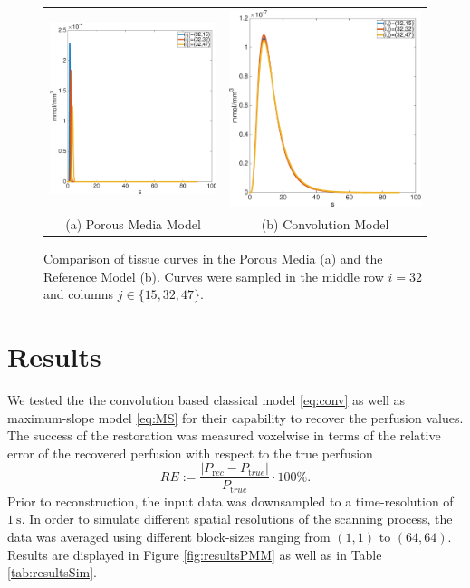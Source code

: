 \documentclass[paper=a4, fontsize=11pt,parskip=half,headings=small]{scrartcl}
\begin{document}
	\begin{figure}[H]
		\centering
		\begin{tabular}{c c}
			\includegraphics[width=.45\textwidth]{figs/PM153247.eps} & \includegraphics[width=.45\textwidth]{figs/RM153247.eps} \\
			(a) Porous Media Model & (b) Convolution Model
		\end{tabular}
		\caption{Comparison of tissue curves in the Porous Media (a) and the Reference Model (b). Curves were sampled in the middle row $i=32$ and columns $j \in \{15,32,47\}$.}
		\label{fig:tissuecomp}
	\end{figure}
	
	

	\section{Results}\label{sec:results}

	We tested the the convolution based classical model \eqref{eq:conv} as well as maximum-slope model \eqref{eq:MS} for their capability to recover the perfusion values.
	The success of the restoration was measured voxelwise in terms of the relative error of the recovered perfusion with respect to the true perfusion
	\[
		RE := \frac{\vert P_{\mathrm rec} - P_{\mathrm true}\vert}{P_{\mathrm true}}\cdot 100\%.
	\]
	Prior to reconstruction, the input data was downsampled to a time-resolution of $\SI{1}{\second}$.
	In order to simulate different spatial resolutions of the scanning process, the data was averaged using different block-sizes ranging from $(1,1)$ to $(64,64)$.
	Results are displayed in Figure \ref{fig:resultsPMM} as well as in Table \ref{tab:resultsSim}.
	
\end{document}
